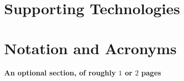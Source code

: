 \documentclass[ %
                    author={Tom Jager},
                supervisor={Dr. Daniel Schien},
                    degree={MEng},
                     title={A Bayesian Inference Engine for UMIS Structured Data},
                  subtitle={},
                      type={research},
                      year={2019} ]{dissertation}
\begin{document}
\chapter*{Supporting Technologies}

\chapter*{Notation and Acronyms}

{\bf An optional section, of roughly $1$ or $2$ pages}
\vspace{1cm} 
\end{document}
